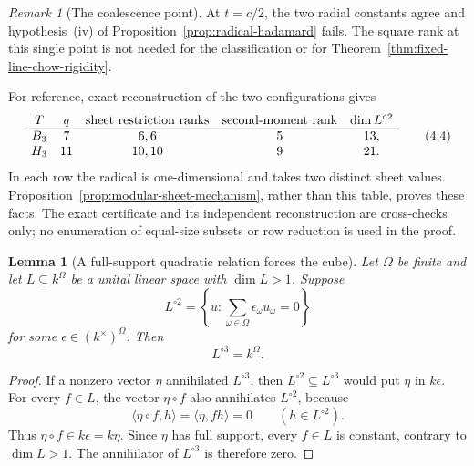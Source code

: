 \documentclass[11pt]{article}
\newtheorem{lemma}[theorem]{Lemma}
\theoremstyle{definition}
\theoremstyle{remark}
\newtheorem{remark}[theorem]{Remark}
\begin{document}
\begin{remark}[The coalescence point]
\label{rem:fixed-line-coalescence}
At \(t=c/2\), the two radial constants agree and hypothesis~(iv) of
Proposition~\ref{prop:radical-hadamard} fails.  The square rank at this
single point is not needed for the classification or for
Theorem~\ref{thm:fixed-line-chow-rigidity}.
\end{remark}

For reference, exact reconstruction of the two configurations gives
\[
\begin{array}{c@{\quad}c@{\quad}c@{\quad}c@{\quad}c}
T&q&\text{sheet restriction ranks}
 &\text{second-moment rank}&\dim L^{\circ2}\\ \hline
B_3&7&6,6&5&13,\\
H_3&11&10,10&9&21.
\end{array}                                                   \tag{4.4}
\]
In each row the radical is one-dimensional and takes two distinct
sheet values.  Proposition~\ref{prop:modular-sheet-mechanism}, rather
than this table, proves these facts.  The exact certificate and its
independent reconstruction are cross-checks only; no enumeration of
equal-size subsets or row reduction is used in the proof.

\begin{lemma}[A full-support quadratic relation forces the cube]
\label{lem:hyperplane-square}
Let \(\Omega\) be finite and let \(L\subseteq k^\Omega\) be a unital
linear space with \(\dim L>1\).  Suppose
\[
 L^{\circ2}
 =\left\{u:\sum_{\omega\in\Omega}\epsilon_\omega u_\omega=0\right\}
\]
for some \(\epsilon\in(k^\times)^\Omega\).  Then
\[
 L^{\circ3}=k^\Omega.
\]
\end{lemma}

\begin{proof}
If a nonzero vector \(\eta\) annihilated \(L^{\circ3}\), then
\(L^{\circ2}\subseteq L^{\circ3}\) would put \(\eta\) in
\(k\epsilon\).  For every \(f\in L\), the vector
\(\eta\circ f\) also annihilates \(L^{\circ2}\), because
\[
 \langle\eta\circ f,h\rangle=\langle\eta,fh\rangle=0
 \qquad(h\in L^{\circ2}).
\]
Thus \(\eta\circ f\in k\epsilon=k\eta\).  Since \(\eta\) has full
support, every \(f\in L\) is constant, contrary to \(\dim L>1\).
The annihilator of \(L^{\circ3}\) is therefore zero.
\end{proof}
\end{document}
